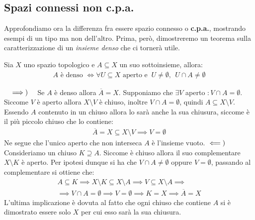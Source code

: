 \subsection{Spazi connessi non c.p.a.}
Approfondiamo ora la differenza fra essere spazio connesso o \textbf{c.p.a.}, mostrando esempi di un tipo ma non dell'altro. Prima, però, dimostreremo un teorema sulla caratterizzazione di un \textit{insieme denso} che ci tornerà utile.
\begin{theorema}
	Sia $X$ uno spazio topologico e $A\subseteq X$ un suo sottoinsieme, allora:
		\begin{gather*}
			A \text{ è denso }\iff \forall U\subseteq X \text{ aperto e } \ U\neq\emptyset, \ \ U\cap A\neq\emptyset	
		\end{gather*}
	\vspace{-6mm}
\end{theorema}
\begin{demonstration}~{}
	$\implies)\quad$ Se $A$ è denso allora $\overline{A}=X$. Supponiamo che $\exists V$ aperto $\colon V\cap A=\emptyset$. Siccome $V$ è aperto allora $X\setminus V$ è chiuso, inoltre $V\cap A=\emptyset$, quindi $A\subseteq X\setminus V$. Essendo $A$ contenuto in un chiuso allora lo sarà anche la sua chiusura, siccome è il più piccolo chiuso che lo contiene:
		\begin{gather*}
			\overline{A}=X\subseteq X\setminus V \implies V=\emptyset
		\end{gather*}
	Ne segue che l'unico aperto che non interseca $A$ è l'insieme vuoto. \newline 
	$\impliedby)\quad$ Consideriamo un chiuso $K\supseteq A$. Siccome è chiuso allora il suo complementare $X\setminus K$ è aperto. Per ipotesi dunque si ha che $V\cap A\neq \emptyset$ oppure $V=\emptyset$, passando al complementare si ottiene che:
		\begin{equation*}
			\begin{array}{l}
				A\subseteq K \implies X\setminus K \subseteq X\setminus A \implies V\subseteq X\setminus A \implies \\
				\implies V\cap A=\emptyset \implies V=\emptyset \implies K=X \implies \overline{A}=X
			\end{array}
		\end{equation*}
	L'ultima implicazione è dovuta al fatto che ogni chiuso che contiene $A$ si è dimostrato essere solo $X$ per cui esso sarà la sua chiusura.
\end{demonstration}

